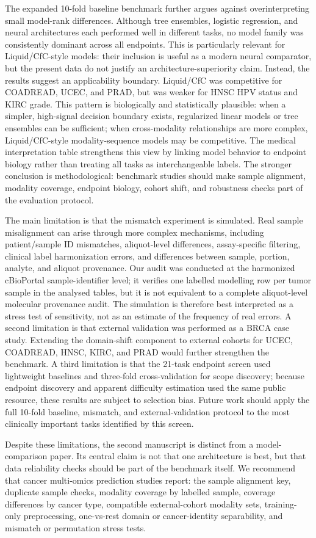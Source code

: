 The expanded 10-fold baseline benchmark further argues against overinterpreting small model-rank differences. Although tree ensembles, logistic regression, and neural architectures each performed well in different tasks, no model family was consistently dominant across all endpoints. This is particularly relevant for Liquid/CfC-style models: their inclusion is useful as a modern neural comparator, but the present data do not justify an architecture-superiority claim. Instead, the results suggest an applicability boundary. Liquid/CfC was competitive for COADREAD, UCEC, and PRAD, but was weaker for HNSC HPV status and KIRC grade. This pattern is biologically and statistically plausible: when a simpler, high-signal decision boundary exists, regularized linear models or tree ensembles can be sufficient; when cross-modality relationships are more complex, Liquid/CfC-style modality-sequence models may be competitive. The medical interpretation table strengthens this view by linking model behavior to endpoint biology rather than treating all tasks as interchangeable labels. The stronger conclusion is methodological: benchmark studies should make sample alignment, modality coverage, endpoint biology, cohort shift, and robustness checks part of the evaluation protocol.

The main limitation is that the mismatch experiment is simulated. Real sample misalignment can arise through more complex mechanisms, including patient/sample ID mismatches, aliquot-level differences, assay-specific filtering, clinical label harmonization errors, and differences between sample, portion, analyte, and aliquot provenance. Our audit was conducted at the harmonized cBioPortal sample-identifier level; it verifies one labelled modelling row per tumor sample in the analysed tables, but it is not equivalent to a complete aliquot-level molecular provenance audit. The simulation is therefore best interpreted as a stress test of sensitivity, not as an estimate of the frequency of real errors. A second limitation is that external validation was performed as a BRCA case study. Extending the domain-shift component to external cohorts for UCEC, COADREAD, HNSC, KIRC, and PRAD would further strengthen the benchmark. A third limitation is that the 21-task endpoint screen used lightweight baselines and three-fold cross-validation for scope discovery; because endpoint discovery and apparent difficulty estimation used the same public resource, these results are subject to selection bias. Future work should apply the full 10-fold baseline, mismatch, and external-validation protocol to the most clinically important tasks identified by this screen.

Despite these limitations, the second manuscript is distinct from a model-comparison paper. Its central claim is not that one architecture is best, but that data reliability checks should be part of the benchmark itself. We recommend that cancer multi-omics prediction studies report: the sample alignment key, duplicate sample checks, modality coverage by labelled sample, coverage differences by cancer type, compatible external-cohort modality sets, training-only preprocessing, one-vs-rest domain or cancer-identity separability, and mismatch or permutation stress tests.
